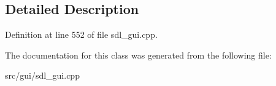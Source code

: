 \subsection{Detailed Description}


Definition at line 552 of file sdl\-\_\-gui.\-cpp.



The documentation for this class was generated from the following file\-:\begin{DoxyCompactItemize}
\item 
src/gui/sdl\-\_\-gui.\-cpp\end{DoxyCompactItemize}
